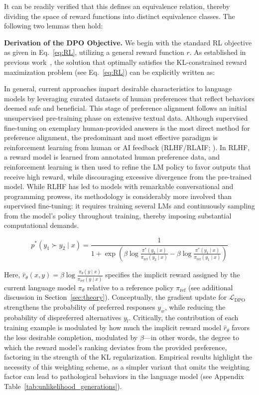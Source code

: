 It can be readily verified that this defines an equivalence relation, thereby dividing the space of reward functions into distinct equivalence classes. The following two lemmas then hold:

\textbf{Derivation of the DPO Objective.} We begin with the standard RL objective as given in Eq.~\ref{eq:RL}, utilizing a general reward function $r$. As established in previous work~\citep{peters2007reinforcement, peng2019advantage, korbak2022reinforcement, go2023aligning}, the solution that optimally satisfies the KL-constrained reward maximization problem (see Eq.~\ref{eq:RL}) can be explicitly written as:

In general, current approaches impart desirable characteristics to language models by leveraging curated datasets of human preferences that reflect behaviors deemed safe and beneficial. This stage of preference alignment follows an initial unsupervised pre-training phase on extensive textual data. Although supervised fine-tuning on exemplary human-provided answers is the most direct method for preference alignment, the predominant and most effective paradigm is reinforcement learning from human or AI feedback (RLHF/RLAIF; \citep{christiano2017deep,bai2022constitutional}). In RLHF, a reward model is learned from annotated human preference data, and reinforcement learning is then used to refine the LM policy to favor outputs that receive high reward, while discouraging excessive divergence from the pre-trained model. While RLHF has led to models with remarkable conversational and programming prowess, its methodology is considerably more involved than supervised fine-tuning: it requires training several LMs and continuously sampling from the model’s policy throughout training, thereby imposing substantial computational demands.

\begin{equation}\label{eq:objective}
    p^*(y_1\succ y_2 \mid x)=\frac{1}{1 + \exp\left(\beta \log \frac{\pi^*(y_2\mid x)}{\pi_\text{ref}(y_2\mid x)} - \beta \log \frac{\pi^*(y_1\mid x)}{\pi_\text{ref}(y_1\mid x)}\right)}
\end{equation}

Here, $\hat{r}_\theta(x, y) = \beta \log \frac{\pi_\theta(y \mid x)}{\pi_\text{ref}(y \mid x)}$ specifies the implicit reward assigned by the current language model $\pi_\theta$ relative to a reference policy $\pi_\text{ref}$ (see additional discussion in Section~\ref{sec:theory}). Conceptually, the gradient update for $\mathcal{L}_\text{DPO}$ strengthens the probability of preferred responses $y_w$, while reducing the probability of dispreferred alternatives $y_l$. Critically, the contribution of each training example is modulated by how much the implicit reward model $\hat{r}_\theta$ favors the less desirable completion, modulated by $\beta$—in other words, the degree to which the reward model's ranking deviates from the provided preference, factoring in the strength of the KL regularization. Empirical results highlight the necessity of this weighting scheme, as a simpler variant that omits the weighting factor can lead to pathological behaviors in the language model (see Appendix Table~\ref{tab:unlikelihood_generations}).

